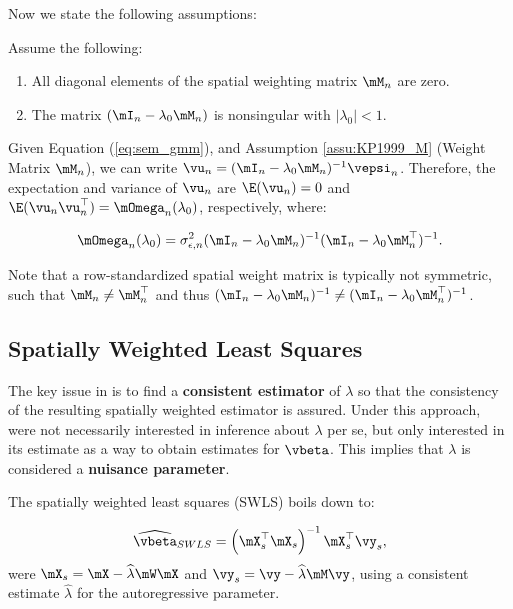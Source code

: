 \documentclass[english,12pt]{book}\usepackage[]{graphicx}\usepackage[]{xcolor}
\begin{document}
Now we state the following assumptions:


\begin{assumption}\label{assu:KP1999_M} Assume the following:
\begin{enumerate}
  \item All diagonal elements of the spatial weighting matrix $\mM_n$ are zero.
  \item The matrix $(\mI_n - \lambda_0\mM_n)$ is nonsingular with $\left|\lambda_0 \right|<1$.
\end{enumerate}
\end{assumption}


Given Equation (\ref{eq:sem_gmm}),  and Assumption \ref{assu:KP1999_M} (Weight Matrix $\mM_n$), we can write $\vu_n = (\mI_n - \lambda_0 \mM_n)^{-1}\vepsi_n$. Therefore, the expectation and variance of $\vu_n$ are $\E(\vu_n) = 0$ and $\E(\vu_n\vu^\top_n) = \mOmega_n(\lambda_0)$, respectively, where:

\begin{equation*}
  \mOmega_n(\lambda_0) = \sigma^2_{\epsilon, n}(\mI_n - \lambda_0\mM_n)^{-1}(\mI_n - \lambda_0\mM_n^\top)^{-1}.
\end{equation*}

Note that a row-standardized spatial weight matrix is typically not symmetric, such that $\mM_n\neq \mM_n^\top$ and thus $(\mI_n - \lambda_0\mM_n)^{-1}\neq (\mI_n - \lambda_0\mM_n^\top)^{-1}$.

\subsection{Spatially Weighted Least Squares}\label{sec:swls}

The key issue in \cite{kelejian1999generalized} is to find a \textbf{consistent estimator} of $\lambda$ so that the consistency of the resulting spatially weighted estimator is assured. Under this approach, \cite{kelejian1999generalized} were not necessarily interested in inference about $\lambda$ per se, but only interested in its estimate as a way to obtain estimates for $\vbeta$. This implies that $\lambda$ is considered a \textbf{nuisance parameter}. 

The spatially weighted least squares (SWLS) boils down to:

\begin{equation}\label{eq:beta_swls}
  \widehat{\vbeta}_{SWLS} = \left(\mX_s^\top\mX_s\right)^{-1}\mX_s^\top\vy_s,
\end{equation}
%
were $\mX_s = \mX - \widehat{\lambda}\mW\mX$ and $\vy_s = \vy - \widehat{\lambda}\mM\vy$, using a consistent estimate $\widehat{\lambda}$ for the autoregressive parameter. 
\end{document}
